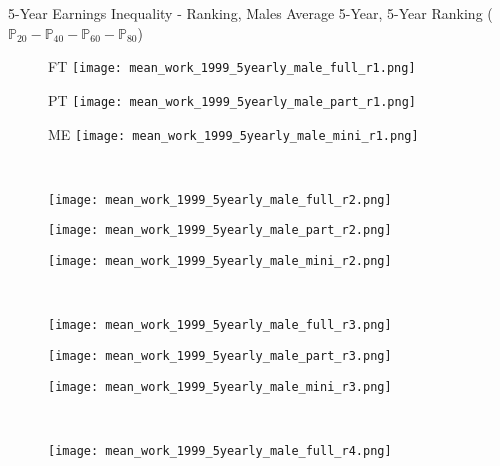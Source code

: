 \documentclass[hyperref={bookmarks=false}]{beamer}
\begin{document}
\begin{appendix}
\begin{frame}{5-Year Earnings Inequality - Ranking, Males}
Average 5-Year, 5-Year Ranking ($\mathbb{P}_{20}-\mathbb{P}_{40}-\mathbb{P}_{60}-\mathbb{P}_{80}$)
\begin{figure}[!t]
\begin{minipage}[b]{0.15\textwidth}{FT}
\centering
\texttt{[image: mean\_work\_1999\_5yearly\_male\_full\_r1.png]}
\end{minipage}
\begin{minipage}[b]{0.15\textwidth}{PT}
\centering
\texttt{[image: mean\_work\_1999\_5yearly\_male\_part\_r1.png]}
\end{minipage}
\begin{minipage}[b]{0.15\textwidth}{ME}
\centering
\texttt{[image: mean\_work\_1999\_5yearly\_male\_mini\_r1.png]}
\end{minipage}\\
\begin{minipage}[b]{0.15\textwidth}{}
\centering
\texttt{[image: mean\_work\_1999\_5yearly\_male\_full\_r2.png]}
\end{minipage}
\begin{minipage}[b]{0.15\textwidth}{}
\centering
\texttt{[image: mean\_work\_1999\_5yearly\_male\_part\_r2.png]}
\end{minipage}
\begin{minipage}[b]{0.15\textwidth}{}
\centering
\texttt{[image: mean\_work\_1999\_5yearly\_male\_mini\_r2.png]}
\end{minipage}\\
\begin{minipage}[b]{0.15\textwidth}{}
\centering
\texttt{[image: mean\_work\_1999\_5yearly\_male\_full\_r3.png]}
\end{minipage}
\begin{minipage}[b]{0.15\textwidth}{}
\centering
\texttt{[image: mean\_work\_1999\_5yearly\_male\_part\_r3.png]}
\end{minipage}
\begin{minipage}[b]{0.15\textwidth}{}
\centering
\texttt{[image: mean\_work\_1999\_5yearly\_male\_mini\_r3.png]}
\end{minipage}\\
\begin{minipage}[b]{0.15\textwidth}{}
\centering
\texttt{[image: mean\_work\_1999\_5yearly\_male\_full\_r4.png]}
\end{minipage}
\begin{minipage}[b]{0.15\textwidth}{}

\end{minipage}
\end{figure}
\end{frame}
\end{appendix}
\end{document}
